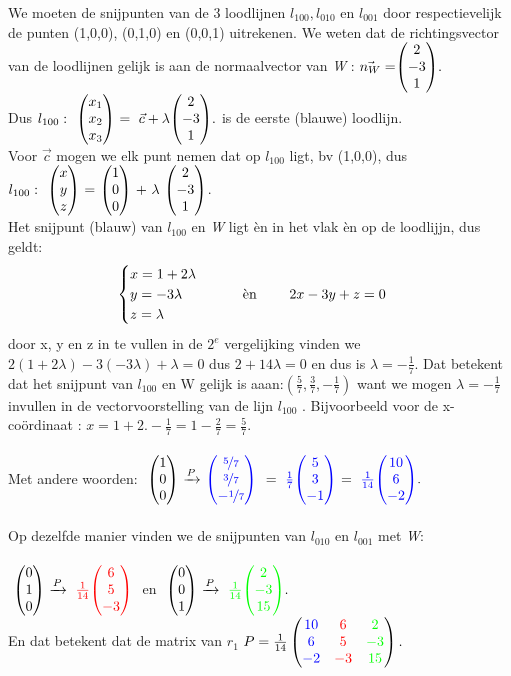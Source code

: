 We moeten  de snijpunten van de 3 loodlijnen $ l_{100}, l_{010} $ en $ l_{001}  $ door respectievelijk de punten (1,0,0), (0,1,0) en (0,0,1) uitrekenen. We weten dat de richtingsvector van de loodlijnen gelijk is aan de normaalvector van \textit{W} : $\vec{n_W} = \vecdrie{2}{-3}{1}. $ \\ 
Dus  $ l_{100}: \ \ \vecdriesnel{x} \ = \  \vec{c} + \lambda \vecdrie{2}{-3}{1}. $ is de eerste (blauwe) loodlijn. \\
Voor $ \vec{c} $ mogen we elk punt  nemen dat op  $ l_{100} $ ligt, bv  (1,0,0), dus
$ l_{100}: \ \ \vecdrie{x}{y}{z} \ = \ \vecdrie{1}{0}{0} \ + \ \lambda \ \vecdrie{2}{-3}{1} $. \\ 
Het snijpunt (blauw) van $ l_{100} $ en\textit{ W}  ligt èn in het vlak  èn op de loodlijjn, dus geldt:
\[\begin{cases}
    x = 1 + 2\lambda  \\
    y= -3\lambda   \qquad \qquad $ èn $ \qquad  2x-3y+z = 0 \\
    z= \lambda 
\end{cases}
\] 
door x, y en z in te  vullen in de $ 2^e $  vergelijking vinden we 
$  2(1 + 2\lambda) - 3 (-3\lambda) + \lambda = 0 $   dus  
$ 2+ 14\lambda  = 0 $ en dus is $  \lambda = -\frac{1}{7}   $. Dat betekent dat het snijpunt van $ l_{100} $ en W gelijk is aaan:$  (\frac{5}{7}, \frac{3}{7}, -\frac{1}{7} )  $   want we mogen $\lambda = -\frac{1}{7} $ invullen in  de vectorvoorstelling van de lijn $ l_{100} $ . Bijvoorbeeld voor  de x-coördinaat : $ x= 1+2. -\frac{1}{7}  = 1 -\frac{2}{7}  =  \frac{5}{7}.  $ \\ \\
Met andere woorden:
$ \ \vecdrie{1}{0}{0}   \  \xrightarrow{P}  \  \vecdrie[blue] {\nicefrac{5}{7} }{\nicefrac{3}{7} }{-\nicefrac{1}{7} }\ 
\ = \   \blu{\frac{1}{7} } \vecdrie[blue] {5}{3}{-1}
\ = \   \blu{\frac{1}{14} } \vecdrie[blue] {10}{6}{-2}. $  \\  \\
Op dezelfde manier vinden we de snijpunten van $ l_{010} $ en  $ l_{001}  $ met  
\textit{W}: \\ \\
$ \ \vecdrie{0}{1}{0}   \  \xrightarrow{P}  \ \red{\frac{1}{14} }  \vecdrie[red]{ 6 }{5 }{-3 }\ $ 
en \quad  
$  \ \vecdrie{0}{0}{1}   \  \xrightarrow{P}  \  \gre{\frac{1}{14} } \vecdrie[green]{2 }{-3 }{15}. $  \\
En dat betekent dat de matrix van $  r_1 $
$ P = 
\frac{1}{14} \begin{pmatrix}   {\color{blue}10} &  {\color{red}6} &   {\color{green}2}  \\    {\color{blue}6}   &   {\color{red}5} &  {\color{green}-3}  \\   {\color{blue}-2} &   {\color{red}-3}  &   {\color{green}15} \end{pmatrix}. $

